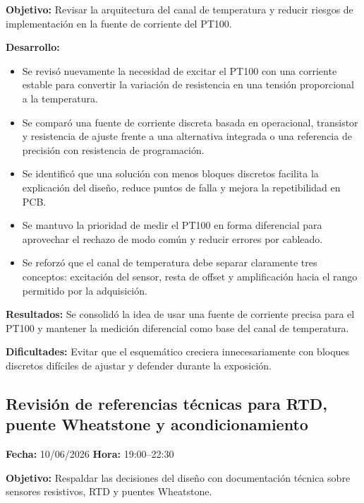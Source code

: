 \documentclass[12pt]{article}
\begin{document}
\textbf{Objetivo:}
Revisar la arquitectura del canal de temperatura y reducir riesgos de implementación en la fuente de corriente del PT100.

\textbf{Desarrollo:}
\begin{itemize}
\item Se revisó nuevamente la necesidad de excitar el PT100 con una corriente estable para convertir la variación de resistencia en una tensión proporcional a la temperatura.
\item Se comparó una fuente de corriente discreta basada en operacional, transistor y resistencia de ajuste frente a una alternativa integrada o una referencia de precisión con resistencia de programación.
\item Se identificó que una solución con menos bloques discretos facilita la explicación del diseño, reduce puntos de falla y mejora la repetibilidad en PCB.
\item Se mantuvo la prioridad de medir el PT100 en forma diferencial para aprovechar el rechazo de modo común y reducir errores por cableado.
\item Se reforzó que el canal de temperatura debe separar claramente tres conceptos: excitación del sensor, resta de offset y amplificación hacia el rango permitido por la adquisición.
\end{itemize}

\textbf{Resultados:}
Se consolidó la idea de usar una fuente de corriente precisa para el PT100 y mantener la medición diferencial como base del canal de temperatura.

\textbf{Dificultades:}
Evitar que el esquemático creciera innecesariamente con bloques discretos difíciles de ajustar y defender durante la exposición.

\subsection{Revisión de referencias técnicas para RTD, puente Wheatstone y acondicionamiento}
\textbf{Fecha:} 10/06/2026 \quad \textbf{Hora:} 19:00--22:30

\textbf{Objetivo:}
Respaldar las decisiones del diseño con documentación técnica sobre sensores resistivos, RTD y puentes Wheatstone.
\end{document}
